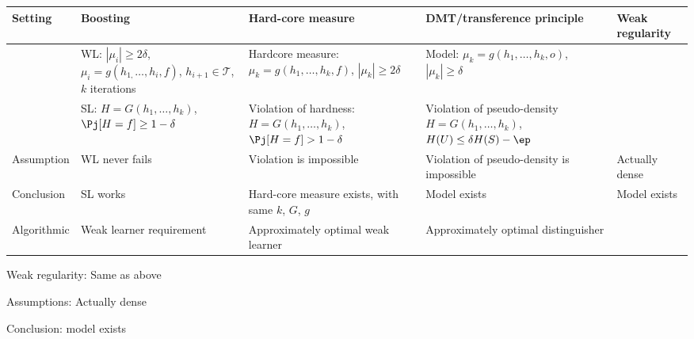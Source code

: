 
\noindent
\begin{tabular}{|p{20mm}|p{35mm}|p{35mm}|p{35mm}|p{15mm}|}
\hline 
Setting & Boosting & Hard-core measure & DMT/transference principle & Weak regularity\tabularnewline

\hline 
 & WL: $|\mu_{i}|\ge2\delta$, $\mu_{i}=g(h_{1,}\ldots,h_{i},f)$, $h_{i+1}\in\mathcal{T}$, $k$
iterations & Hardcore measure: $\mu_{k}=g(h_{1},\ldots,h_{k},f)$, $|\mu_{k}|\ge2\delta$ & Model: $\mu_{k}=g(h_{1},\ldots,h_{k},o)$, $|\mu_{k}|\ge\delta$& \tabularnewline 
\hline 
 & SL: $H=G(h_{1},\ldots,h_{k})$, $\Pj[H=f]\ge1-\delta$ & Violation of hardness: $H=G(h_{1},\ldots,h_{k})$, $\Pj[H=f]>1-\delta$ & Violation of pseudo-density $H=G(h_{1},\ldots,h_{k})$, $H(U)\le\delta H(S)-\ep$& 
 \tabularnewline
\hline 
Assumption & WL never fails & Violation is impossible & Violation of pseudo-density is impossible
& Actually dense \tabularnewline
\hline 
Conclusion & SL works & Hard-core measure exists, with same $k$, $G$, $g$ & Model exists & Model exists
\tabularnewline
\hline 
Algorithmic & Weak learner requirement & Approximately optimal weak learner & Approximately optimal distinguisher & \tabularnewline
\hline 
\end{tabular}

Weak regularity: Same as above

Assumptions: Actually dense

Conclusion: model exists

